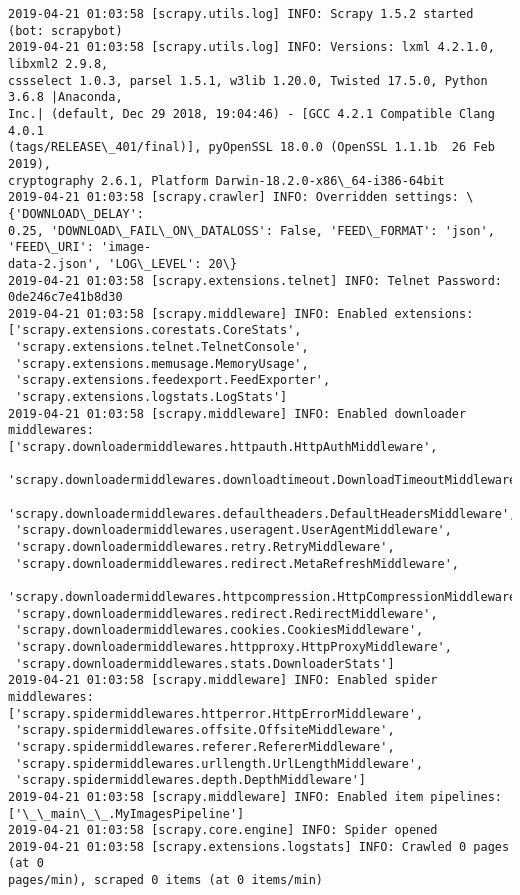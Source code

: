 \documentclass[11pt]{article}
\begin{document}
    \begin{Verbatim}[commandchars=\\\{\},fontsize=\footnotesize]
2019-04-21 01:03:58 [scrapy.utils.log] INFO: Scrapy 1.5.2 started (bot: scrapybot)
2019-04-21 01:03:58 [scrapy.utils.log] INFO: Versions: lxml 4.2.1.0, libxml2 2.9.8,
cssselect 1.0.3, parsel 1.5.1, w3lib 1.20.0, Twisted 17.5.0, Python 3.6.8 |Anaconda,
Inc.| (default, Dec 29 2018, 19:04:46) - [GCC 4.2.1 Compatible Clang 4.0.1
(tags/RELEASE\_401/final)], pyOpenSSL 18.0.0 (OpenSSL 1.1.1b  26 Feb 2019),
cryptography 2.6.1, Platform Darwin-18.2.0-x86\_64-i386-64bit
2019-04-21 01:03:58 [scrapy.crawler] INFO: Overridden settings: \{'DOWNLOAD\_DELAY':
0.25, 'DOWNLOAD\_FAIL\_ON\_DATALOSS': False, 'FEED\_FORMAT': 'json', 'FEED\_URI': 'image-
data-2.json', 'LOG\_LEVEL': 20\}
2019-04-21 01:03:58 [scrapy.extensions.telnet] INFO: Telnet Password: 0de246c7e41b8d30
2019-04-21 01:03:58 [scrapy.middleware] INFO: Enabled extensions:
['scrapy.extensions.corestats.CoreStats',
 'scrapy.extensions.telnet.TelnetConsole',
 'scrapy.extensions.memusage.MemoryUsage',
 'scrapy.extensions.feedexport.FeedExporter',
 'scrapy.extensions.logstats.LogStats']
2019-04-21 01:03:58 [scrapy.middleware] INFO: Enabled downloader middlewares:
['scrapy.downloadermiddlewares.httpauth.HttpAuthMiddleware',
 'scrapy.downloadermiddlewares.downloadtimeout.DownloadTimeoutMiddleware',
 'scrapy.downloadermiddlewares.defaultheaders.DefaultHeadersMiddleware',
 'scrapy.downloadermiddlewares.useragent.UserAgentMiddleware',
 'scrapy.downloadermiddlewares.retry.RetryMiddleware',
 'scrapy.downloadermiddlewares.redirect.MetaRefreshMiddleware',
 'scrapy.downloadermiddlewares.httpcompression.HttpCompressionMiddleware',
 'scrapy.downloadermiddlewares.redirect.RedirectMiddleware',
 'scrapy.downloadermiddlewares.cookies.CookiesMiddleware',
 'scrapy.downloadermiddlewares.httpproxy.HttpProxyMiddleware',
 'scrapy.downloadermiddlewares.stats.DownloaderStats']
2019-04-21 01:03:58 [scrapy.middleware] INFO: Enabled spider middlewares:
['scrapy.spidermiddlewares.httperror.HttpErrorMiddleware',
 'scrapy.spidermiddlewares.offsite.OffsiteMiddleware',
 'scrapy.spidermiddlewares.referer.RefererMiddleware',
 'scrapy.spidermiddlewares.urllength.UrlLengthMiddleware',
 'scrapy.spidermiddlewares.depth.DepthMiddleware']
2019-04-21 01:03:58 [scrapy.middleware] INFO: Enabled item pipelines:
['\_\_main\_\_.MyImagesPipeline']
2019-04-21 01:03:58 [scrapy.core.engine] INFO: Spider opened
2019-04-21 01:03:58 [scrapy.extensions.logstats] INFO: Crawled 0 pages (at 0
pages/min), scraped 0 items (at 0 items/min)

\end{Verbatim}
\end{document}
